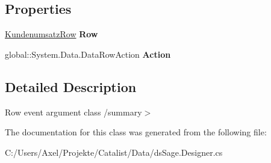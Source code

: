 \subsection*{Properties}
\begin{DoxyCompactItemize}
\item 
\hyperlink{class_products_1_1_data_1_1ds_sage_1_1_kundenumsatz_row}{Kundenumsatz\+Row} {\bfseries Row}\hypertarget{class_products_1_1_data_1_1ds_sage_1_1_kundenumsatz_row_change_event_a580fc6a639c725b7fa6de30c13fd7a16}{}\label{class_products_1_1_data_1_1ds_sage_1_1_kundenumsatz_row_change_event_a580fc6a639c725b7fa6de30c13fd7a16}

\item 
global\+::\+System.\+Data.\+Data\+Row\+Action {\bfseries Action}\hypertarget{class_products_1_1_data_1_1ds_sage_1_1_kundenumsatz_row_change_event_a32afc3f49f35d71b692e4602f989cb7b}{}\label{class_products_1_1_data_1_1ds_sage_1_1_kundenumsatz_row_change_event_a32afc3f49f35d71b692e4602f989cb7b}

\end{DoxyCompactItemize}


\subsection{Detailed Description}
Row event argument class /summary$>$ 

The documentation for this class was generated from the following file\+:\begin{DoxyCompactItemize}
\item 
C\+:/\+Users/\+Axel/\+Projekte/\+Catalist/\+Data/ds\+Sage.\+Designer.\+cs\end{DoxyCompactItemize}
